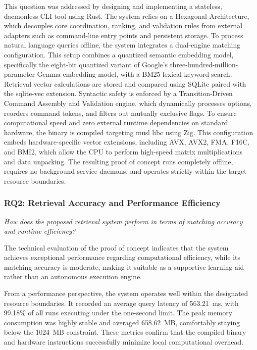 This question was addressed by designing and implementing a stateless, daemonless CLI tool using Rust. The system relies on a Hexagonal Architecture, which decouples core coordination, ranking, and validation rules from external adapters such as command-line entry points and persistent storage. To process natural language queries offline, the system integrates a dual-engine matching configuration. This setup combines a quantized semantic embedding model, specifically the eight-bit quantized variant of Google's three-hundred-million-parameter Gemma embedding model, with a BM25 lexical keyword search. Retrieval vector calculations are stored and compared using SQLite paired with the sqlite-vec extension. Syntactic safety is enforced by a Transition-Driven Command Assembly and Validation engine, which dynamically processes options, reorders command tokens, and filters out mutually exclusive flags. To ensure computational speed and zero external runtime dependencies on standard hardware, the binary is compiled targeting musl libc using Zig. This configuration embeds hardware-specific vector extensions, including AVX, AVX2, FMA, F16C, and BMI2, which allow the CPU to perform high-speed matrix multiplications and data unpacking. The resulting proof of concept runs completely offline, requires no background service daemons, and operates strictly within the target resource boundaries.

\subsubsection{RQ2: Retrieval Accuracy and Performance Efficiency}

\textit{How does the proposed retrieval system perform in terms of matching accuracy and runtime efficiency?}

The technical evaluation of the proof of concept indicates that the system achieves exceptional performance regarding computational efficiency, while its matching accuracy is moderate, making it suitable as a supportive learning aid rather than an autonomous execution engine.

From a performance perspective, the system operates well within the designated resource boundaries. It recorded an average query latency of 563.21~ms, with 99.18\% of all runs executing under the one-second limit. The peak memory consumption was highly stable and averaged 658.62~MB, comfortably staying below the 1024~MB constraint. These metrics confirm that the compiled binary and hardware instructions successfully minimize local computational overhead.

